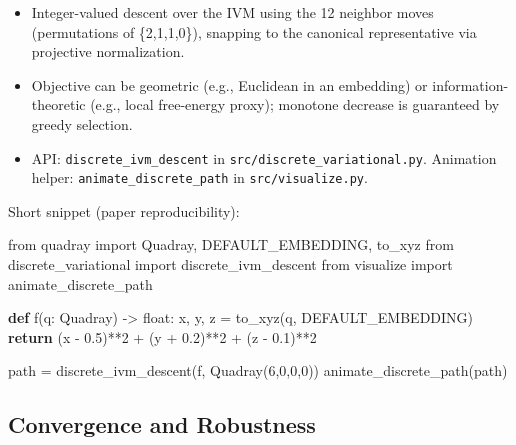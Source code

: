 \documentclass[
  10pt,
]{article}
\newenvironment{Shaded}{}{}
\newcommand{\BuiltInTok}[1]{#1}
\newcommand{\ControlFlowTok}[1]{\textcolor[rgb]{0.00,0.44,0.13}{\textbf{#1}}}
\newcommand{\DecValTok}[1]{\textcolor[rgb]{0.25,0.63,0.44}{#1}}
\newcommand{\FloatTok}[1]{\textcolor[rgb]{0.25,0.63,0.44}{#1}}
\newcommand{\ImportTok}[1]{#1}
\newcommand{\KeywordTok}[1]{\textcolor[rgb]{0.00,0.44,0.13}{\textbf{#1}}}
\newcommand{\NormalTok}[1]{#1}
\newcommand{\OperatorTok}[1]{\textcolor[rgb]{0.40,0.40,0.40}{#1}}
\providecommand{\tightlist}{%
  \setlength{\itemsep}{0pt}\setlength{\parskip}{0pt}}
\begin{document}
\begin{itemize}
\tightlist
\item
  Integer-valued descent over the IVM using the 12 neighbor moves
  (permutations of \{2,1,1,0\}), snapping to the canonical
  representative via projective normalization.
\item
  Objective can be geometric (e.g., Euclidean in an embedding) or
  information-theoretic (e.g., local free-energy proxy); monotone
  decrease is guaranteed by greedy selection.
\item
  API: \texttt{discrete\_ivm\_descent} in
  \texttt{src/discrete\_variational.py}. Animation helper:
  \texttt{animate\_discrete\_path} in \texttt{src/visualize.py}.
\end{itemize}

Short snippet (paper reproducibility):

\begin{Shaded}
\begin{Highlighting}[]
\ImportTok{from}\NormalTok{ quadray }\ImportTok{import}\NormalTok{ Quadray, DEFAULT\_EMBEDDING, to\_xyz}
\ImportTok{from}\NormalTok{ discrete\_variational }\ImportTok{import}\NormalTok{ discrete\_ivm\_descent}
\ImportTok{from}\NormalTok{ visualize }\ImportTok{import}\NormalTok{ animate\_discrete\_path}

\KeywordTok{def}\NormalTok{ f(q: Quadray) }\OperatorTok{{-}\textgreater{}} \BuiltInTok{float}\NormalTok{:}
\NormalTok{    x, y, z }\OperatorTok{=}\NormalTok{ to\_xyz(q, DEFAULT\_EMBEDDING)}
    \ControlFlowTok{return}\NormalTok{ (x }\OperatorTok{{-}} \FloatTok{0.5}\NormalTok{)}\OperatorTok{**}\DecValTok{2} \OperatorTok{+}\NormalTok{ (y }\OperatorTok{+} \FloatTok{0.2}\NormalTok{)}\OperatorTok{**}\DecValTok{2} \OperatorTok{+}\NormalTok{ (z }\OperatorTok{{-}} \FloatTok{0.1}\NormalTok{)}\OperatorTok{**}\DecValTok{2}

\NormalTok{path }\OperatorTok{=}\NormalTok{ discrete\_ivm\_descent(f, Quadray(}\DecValTok{6}\NormalTok{,}\DecValTok{0}\NormalTok{,}\DecValTok{0}\NormalTok{,}\DecValTok{0}\NormalTok{))}
\NormalTok{animate\_discrete\_path(path)}
\end{Highlighting}
\end{Shaded}

\hypertarget{convergence-and-robustness}{%
\subsection{Convergence and
Robustness}\label{convergence-and-robustness}}
\end{document}
